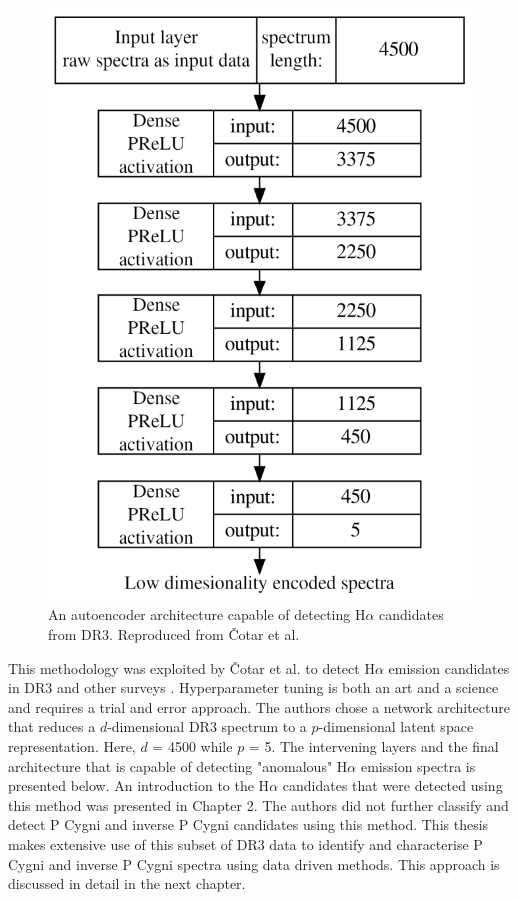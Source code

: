 \begin{figure}[h]
\centering
\includegraphics[scale=0.45]{figures/autoencoder.png}
\caption{An autoencoder architecture capable of detecting H$\alpha$ candidates from DR3. Reproduced from Čotar et al. \cite{vcotar2021galah}}
\end{figure}

This methodology was exploited by Čotar et al. to detect H$\alpha$ emission candidates in DR3 and other surveys \cite{vcotar2021galah}. Hyperparameter tuning is both an art and a science and requires a trial and error approach. The authors chose a network architecture that reduces a $d$-dimensional DR3 spectrum to a $p$-dimensional latent space representation. Here, $d$ = 4500 while $p$ = 5. The intervening layers and the final architecture that is capable of detecting "anomalous" H$\alpha$ emission spectra is presented below. An introduction to the H$\alpha$ candidates that were detected using this method was presented in Chapter 2. The authors did not further classify and detect P Cygni and inverse P Cygni candidates using this method. This thesis makes extensive use of this subset of DR3 data to identify and characterise P Cygni and inverse P Cygni spectra using data driven methods. This approach is discussed in detail in the next chapter. 

